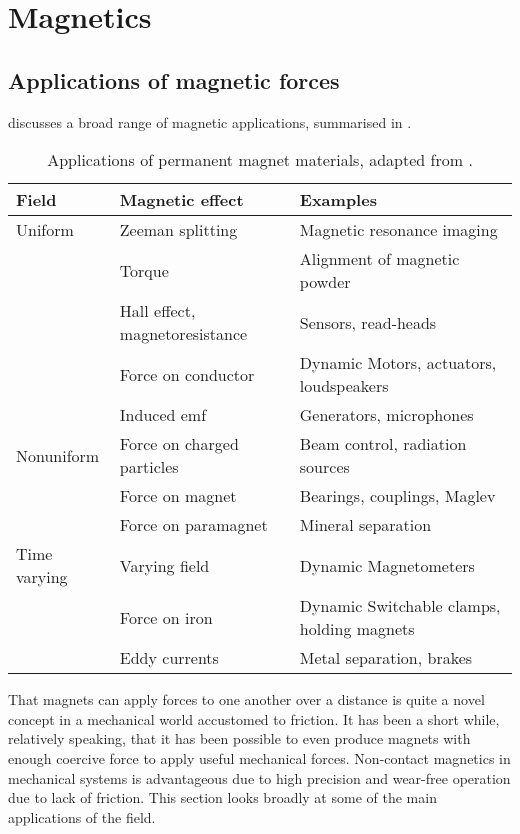 \section{Magnetics}

\subsection{Applications of magnetic forces}

\textcite{coey2002} discusses a broad range of magnetic applications,
summarised in .

\begin{table}
\begin{wide}
\begin{tabular}{@{}lll@{}}
\toprule
Field & Magnetic effect & Examples \\
\midrule
Uniform & Zeeman splitting & Magnetic resonance imaging \\
& Torque & Alignment of magnetic powder \\
& Hall effect, magnetoresistance & Sensors, read-heads \\
& Force on conductor & Dynamic Motors, actuators, loudspeakers \\
& Induced emf & Generators, microphones \\
Nonuniform & Force on charged particles & Beam control, 
radiation sources %
\\
& Force on magnet & Bearings, couplings, Maglev \\
& Force on paramagnet & Mineral separation \\
Time varying & Varying field & Dynamic Magnetometers \\
& Force on iron & Dynamic Switchable clamps, holding magnets \\
& Eddy currents & Metal separation, brakes \\
\bottomrule
\end{tabular}
\end{wide}
\caption{Applications of permanent magnet materials, 
adapted from \textcite{coey2002}.}
\end{table}

That magnets can apply forces to one another over a distance is quite a novel
concept in a mechanical world accustomed to friction.
It has been a short
while, relatively speaking, that it has been possible to even produce
magnets with enough coercive force to apply useful mechanical forces.
Non-contact magnetics in mechanical systems is advantageous due to high
precision and wear-free operation due to lack of friction.
This section looks
broadly at some of the main applications of the field.

